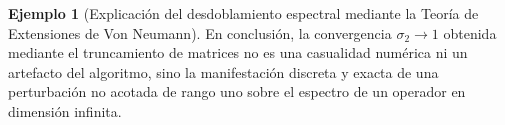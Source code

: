 \documentclass[12pt,a4paper]{article}
\theoremstyle{definition}
\newtheorem{ejemplo}{Ejemplo}
\theoremstyle{remark}
\begin{document}
\begin{ejemplo}[Explicación del desdoblamiento espectral mediante la Teoría de Extensiones de Von Neumann]
    En conclusión, la convergencia $\sigma_2 \to 1$ obtenida mediante el truncamiento de matrices no es una casualidad numérica ni un artefacto del algoritmo, sino la manifestación discreta y exacta de una perturbación no acotada de rango uno sobre el espectro de un operador en dimensión infinita.
\end{ejemplo}



\end{document}
